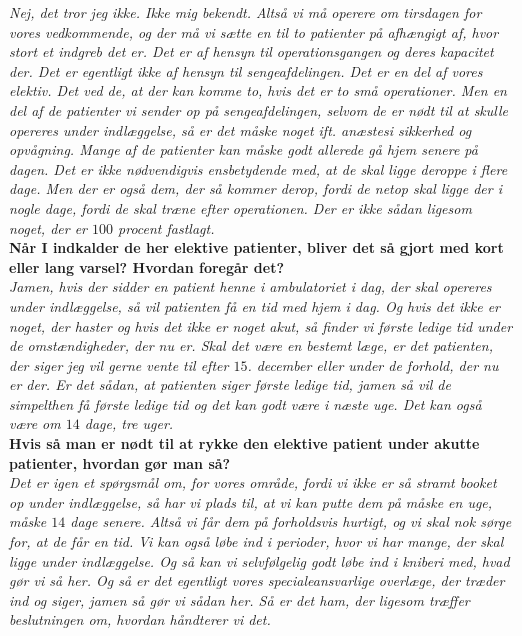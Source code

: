 \textit{Nej, det tror jeg ikke. Ikke mig bekendt. Altså vi må operere om tirsdagen for vores vedkommende, og der må vi sætte en til to patienter på afhængigt af, hvor stort et indgreb det er. Det er af hensyn til operationsgangen og deres kapacitet der. Det er egentligt ikke af hensyn til sengeafdelingen. Det er en del af vores elektiv. Det ved de, at der kan komme to, hvis det er to små operationer. Men en del af de patienter vi sender op på sengeafdelingen, selvom de er nødt til at skulle opereres under indlæggelse, så er det måske noget ift. anæstesi sikkerhed og opvågning. Mange af de patienter kan måske godt allerede gå hjem senere på dagen. Det er ikke nødvendigvis ensbetydende med, at de skal ligge deroppe i flere dage. Men der er også dem, der så kommer derop, fordi de netop skal ligge der i nogle dage, fordi de skal træne efter operationen. Der er ikke sådan ligesom noget, der er $100$ procent fastlagt.}\\
\textbf{Når I indkalder de her elektive patienter, bliver det så gjort med kort eller lang varsel? Hvordan foregår det?}\\
\noindent
\textit{Jamen, hvis der sidder en patient henne i ambulatoriet i dag, der skal opereres under indlæggelse, så vil patienten få en tid med hjem i dag. Og hvis det ikke er noget, der haster og hvis det ikke er noget akut, så finder vi første ledige tid under de omstændigheder, der nu er. Skal det være en bestemt læge, er det patienten, der siger jeg vil gerne vente til efter $15$. december eller under de forhold, der nu er der. Er det sådan, at patienten siger første ledige tid, jamen så vil de simpelthen få første ledige tid og det kan godt være i næste uge. Det kan også være om $14$ dage, tre uger.}\\
\textbf{Hvis så man er nødt til at rykke den elektive patient under akutte patienter, hvordan gør man så?}\\
\noindent
\textit{Det er igen et spørgsmål om, for vores område, fordi vi ikke er så stramt booket op under indlæggelse, så har vi plads til, at vi kan putte dem på måske en uge, måske $14$ dage senere. Altså vi får dem på forholdsvis hurtigt, og vi skal nok sørge for, at de får en tid. Vi kan også løbe ind i perioder, hvor vi har mange, der skal ligge under indlæggelse. Og så kan vi selvfølgelig godt løbe ind i kniberi med, hvad gør vi så her. Og så er det egentligt vores specialeansvarlige overlæge, der træder ind og siger, jamen så gør vi sådan her. Så er det ham, der ligesom træffer beslutningen om, hvordan håndterer vi det.}\\
